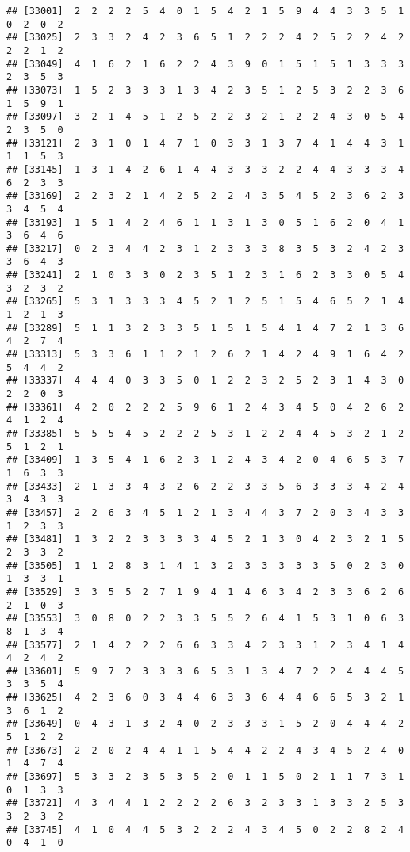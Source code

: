 \documentclass[
]{article}
\begin{document}
\begin{verbatim}
## [33001]  2  2  2  2  5  4  0  1  5  4  2  1  5  9  4  4  3  3  5  1  0  2  0  2
## [33025]  2  3  3  2  4  2  3  6  5  1  2  2  2  4  2  5  2  2  4  2  2  2  1  2
## [33049]  4  1  6  2  1  6  2  2  4  3  9  0  1  5  1  5  1  3  3  3  2  3  5  3
## [33073]  1  5  2  3  3  3  1  3  4  2  3  5  1  2  5  3  2  2  3  6  1  5  9  1
## [33097]  3  2  1  4  5  1  2  5  2  2  3  2  1  2  2  4  3  0  5  4  2  3  5  0
## [33121]  2  3  1  0  1  4  7  1  0  3  3  1  3  7  4  1  4  4  3  1  1  1  5  3
## [33145]  1  3  1  4  2  6  1  4  4  3  3  3  2  2  4  4  3  3  3  4  6  2  3  3
## [33169]  2  2  3  2  1  4  2  5  2  2  4  3  5  4  5  2  3  6  2  3  3  4  5  4
## [33193]  1  5  1  4  2  4  6  1  1  3  1  3  0  5  1  6  2  0  4  1  3  6  4  6
## [33217]  0  2  3  4  4  2  3  1  2  3  3  3  8  3  5  3  2  4  2  3  3  6  4  3
## [33241]  2  1  0  3  3  0  2  3  5  1  2  3  1  6  2  3  3  0  5  4  3  2  3  2
## [33265]  5  3  1  3  3  3  4  5  2  1  2  5  1  5  4  6  5  2  1  4  1  2  1  3
## [33289]  5  1  1  3  2  3  3  5  1  5  1  5  4  1  4  7  2  1  3  6  4  2  7  4
## [33313]  5  3  3  6  1  1  2  1  2  6  2  1  4  2  4  9  1  6  4  2  5  4  4  2
## [33337]  4  4  4  0  3  3  5  0  1  2  2  3  2  5  2  3  1  4  3  0  2  2  0  3
## [33361]  4  2  0  2  2  2  5  9  6  1  2  4  3  4  5  0  4  2  6  2  4  1  2  4
## [33385]  5  5  5  4  5  2  2  2  5  3  1  2  2  4  4  5  3  2  1  2  5  1  2  1
## [33409]  1  3  5  4  1  6  2  3  1  2  4  3  4  2  0  4  6  5  3  7  1  6  3  3
## [33433]  2  1  3  3  4  3  2  6  2  2  3  3  5  6  3  3  3  4  2  4  3  4  3  3
## [33457]  2  2  6  3  4  5  1  2  1  3  4  4  3  7  2  0  3  4  3  3  1  2  3  3
## [33481]  1  3  2  2  3  3  3  3  4  5  2  1  3  0  4  2  3  2  1  5  2  3  3  2
## [33505]  1  1  2  8  3  1  4  1  3  2  3  3  3  3  3  5  0  2  3  0  1  3  3  1
## [33529]  3  3  5  5  2  7  1  9  4  1  4  6  3  4  2  3  3  6  2  6  2  1  0  3
## [33553]  3  0  8  0  2  2  3  3  5  5  2  6  4  1  5  3  1  0  6  3  8  1  3  4
## [33577]  2  1  4  2  2  2  6  6  3  3  4  2  3  3  1  2  3  4  1  4  4  2  4  2
## [33601]  5  9  7  2  3  3  3  6  5  3  1  3  4  7  2  2  4  4  4  5  3  3  5  4
## [33625]  4  2  3  6  0  3  4  4  6  3  3  6  4  4  6  6  5  3  2  1  3  6  1  2
## [33649]  0  4  3  1  3  2  4  0  2  3  3  3  1  5  2  0  4  4  4  2  5  1  2  2
## [33673]  2  2  0  2  4  4  1  1  5  4  4  2  2  4  3  4  5  2  4  0  1  4  7  4
## [33697]  5  3  3  2  3  5  3  5  2  0  1  1  5  0  2  1  1  7  3  1  0  1  3  3
## [33721]  4  3  4  4  1  2  2  2  2  6  3  2  3  3  1  3  3  2  5  3  3  2  3  2
## [33745]  4  1  0  4  4  5  3  2  2  2  4  3  4  5  0  2  2  8  2  4  0  4  1  0

\end{verbatim}
\end{document}

